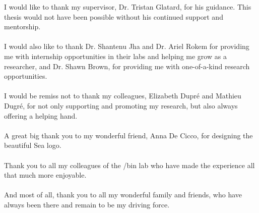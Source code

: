 \begin{acknowledgments}
  I would like to thank my supervisor, Dr. Tristan Glatard, for his guidance. This thesis would not have been possible without his continued support and mentorship.
  \\
  \\
  I would also like to thank Dr. Shantenu Jha and Dr. Ariel Rokem for providing me with internship opportunities in their labs and helping me grow as a researcher, and Dr. Shawn Brown, for providing me with one-of-a-kind research opportunities.
  \\
  \\
  I would be remiss not to thank my colleagues, Elizabeth Dupr\'e and Mathieu Dugr\'e, for not only supporting and promoting my research, but also always offering a helping hand.
  \\
  \\
  A great big thank you to my wonderful friend, Anna De Cicco, for designing the beautiful Sea logo.
  \\
  \\
  Thank you to all my colleagues of the /bin lab who have made the experience all that much more enjoyable.
  \\
  \\
  And most of all, thank you to all my wonderful family and friends, who have always been there and remain to be my driving force.


\end{acknowledgments}